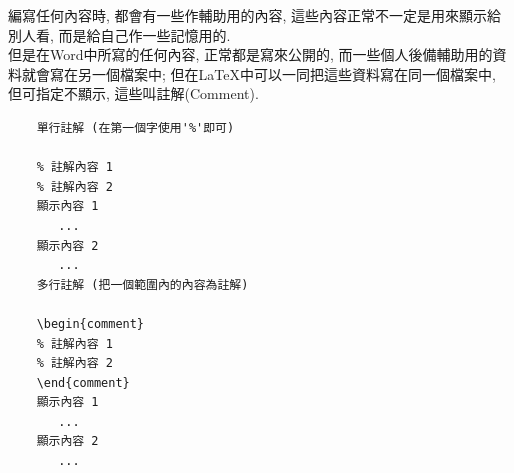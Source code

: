 
編寫任何內容時, 都會有一些作輔助用的內容, 這些內容正常不一定是用來顯示給別人看, 而是給自己作一些記憶用的.\\

但是在Word中所寫的任何內容, 正常都是寫來公開的, 而一些個人後備輔助用的資料就會寫在另一個檔案中; 但在LaTeX中可以一同把這些資料寫在同一個檔案中, 但可指定不顯示, 這些叫註解(Comment).\\

\begin{DescriptionFrame}
  \begin{verbatim}
    單行註解 (在第一個字使用'%'即可)

    % 註解內容 1
    % 註解內容 2
    顯示內容 1
       ...
    顯示內容 2
       ...
    多行註解 (把一個範圍內的內容為註解)

    \begin{comment}
    % 註解內容 1
    % 註解內容 2
    \end{comment}
    顯示內容 1
       ...
    顯示內容 2
       ...
  \end{verbatim}
\end{DescriptionFrame}
